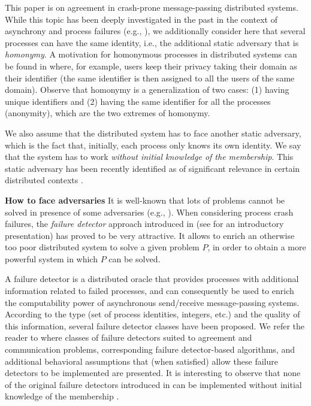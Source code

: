 \documentclass[10pt, conference, compsocconf]{IEEEtran}
\newcommand{\tightparagraph}[1]{\smallskip \noindent \textbf{#1} \hspace{1ex}}
\begin{document}
This paper is on agreement in  crash-prone  message-passing  distributed
systems. While  this topic  has been deeply  investigated in  the past
in the context of asynchrony and process failures 
(e.g., \cite{L96,R10}), we additionally consider here that 
several  processes can have  the  same identity,  i.e.,  the  
additional static adversary  that is {\it homonymy}. 
A motivation for homonymous processes in distributed 
systems can be found in \cite{DFGKRT11} where, for example, 
users keep their privacy taking their domain as their identifier 
(the same identifier is then
assigned to all the users of the same domain). Observe that 
homonymy is a generalization
of two cases: (1) having unique identifiers and 
(2) having the same identifier for all the processes (anonymity), 
which are the two extremes of homonymy.


We also assume  that the distributed system has to face
another static adversary, which is the fact that, initially, 
each process only 
knows its own identity. We say that the system has to work 
\emph{without initial knowledge of the membership}. 
This static adversary has been recently identified 
as of significant relevance in certain distributed contexts
\cite{DBLP:journals/ipl/JimenezAF06}.


\tightparagraph{How to face adversaries}
It is well-known that lots of problems cannot be solved in 
presence of some adversaries 
(e.g., \cite{DBLP:conf/stoc/Angluin80,DBLP:journals/jacm/AttiyaSW88,
DBLP:journals/jacm/FischerLP85,DBLP:journals/tpds/YamashitaK96}). 
When  considering  process  crash  failures,  the  
{\it  failure  detector} approach introduced in 
\cite{DBLP:journals/jacm/ChandraHT96,DBLP:journals/jacm/ChandraT96} 
(see  \cite{R09}   for an 
introductory presentation) has  proved to be very attractive.  
It allows to enrich an otherwise too poor distributed  system 
to solve a given problem $P$,  in order to obtain a more powerful system 
in which $P$ can be solved. 

A failure detector is a  distributed oracle  that provides processes with
additional information related to  failed processes, and can consequently be
used to enrich the computability power of asynchronous  send/receive 
message-passing systems.
According to the  type (set  of process  identities, integers,
etc.) and  the quality  of  this  information,  several failure  detector
classes have been proposed. 
We refer the reader to  \cite{R10} where classes of 
failure detectors  suited to  agreement and communication
problems, corresponding failure detector-based algorithms, and 
additional behavioral assumptions that (when satisfied) allow 
these failure detectors to be implemented are presented.
It is interesting to observe that none of the original failure detectors
introduced in \cite{DBLP:journals/jacm/ChandraT96} can be implemented
without initial knowledge of the 
membership \cite{DBLP:journals/ipl/JimenezAF06}.
\end{document}
